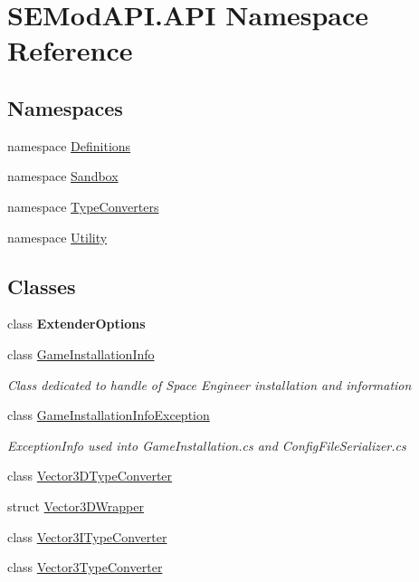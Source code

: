 \hypertarget{namespace_s_e_mod_a_p_i_1_1_a_p_i}{}\section{S\+E\+Mod\+A\+P\+I.\+A\+P\+I Namespace Reference}
\label{namespace_s_e_mod_a_p_i_1_1_a_p_i}
\subsection*{Namespaces}
\begin{DoxyCompactItemize}
\item 
namespace \hyperlink{namespace_s_e_mod_a_p_i_1_1_a_p_i_1_1_definitions}{Definitions}
\item 
namespace \hyperlink{namespace_s_e_mod_a_p_i_1_1_a_p_i_1_1_sandbox}{Sandbox}
\item 
namespace \hyperlink{namespace_s_e_mod_a_p_i_1_1_a_p_i_1_1_type_converters}{Type\+Converters}
\item 
namespace \hyperlink{namespace_s_e_mod_a_p_i_1_1_a_p_i_1_1_utility}{Utility}
\end{DoxyCompactItemize}
\subsection*{Classes}
\begin{DoxyCompactItemize}
\item 
class {\bfseries Extender\+Options}
\item 
class \hyperlink{class_s_e_mod_a_p_i_1_1_a_p_i_1_1_game_installation_info}{Game\+Installation\+Info}
\begin{DoxyCompactList}\small\item\em Class dedicated to handle of Space Engineer installation and information \end{DoxyCompactList}\item 
class \hyperlink{class_s_e_mod_a_p_i_1_1_a_p_i_1_1_game_installation_info_exception}{Game\+Installation\+Info\+Exception}
\begin{DoxyCompactList}\small\item\em Exception\+Info used into Game\+Installation.\+cs and Config\+File\+Serializer.\+cs \end{DoxyCompactList}\item 
class \hyperlink{class_s_e_mod_a_p_i_1_1_a_p_i_1_1_vector3_d_type_converter}{Vector3\+D\+Type\+Converter}
\item 
struct \hyperlink{struct_s_e_mod_a_p_i_1_1_a_p_i_1_1_vector3_d_wrapper}{Vector3\+D\+Wrapper}
\item 
class \hyperlink{class_s_e_mod_a_p_i_1_1_a_p_i_1_1_vector3_i_type_converter}{Vector3\+I\+Type\+Converter}
\item 
class \hyperlink{class_s_e_mod_a_p_i_1_1_a_p_i_1_1_vector3_type_converter}{Vector3\+Type\+Converter}
\end{DoxyCompactItemize}
